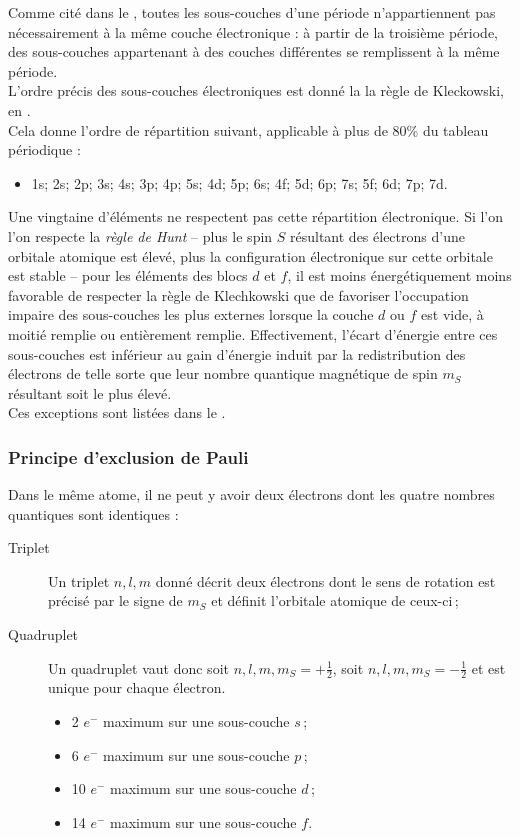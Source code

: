 Comme cité dans le , toutes les sous-couches d'une période n'appartiennent pas nécessairement à la même couche électronique : à partir de la troisième période, des sous-couches appartenant à des couches différentes se remplissent à la même période.\\L'ordre précis des sous-couches électroniques est donné la la règle de Kleckowski, en .\\
Cela donne l'ordre de répartition suivant, applicable à plus de 80\% du tableau périodique : 
\begin{itemize}
	\item 1s; 2s; 2p; 3s; 4s; 3p; 4p; 5s; 4d; 5p; 6s; 4f; 5d; 6p; 7s; 5f; 6d; 7p; 7d.
\end{itemize}



Une vingtaine d'éléments ne respectent pas cette répartition électronique. Si l'on l'on respecte la \emph{règle de Hunt} -- plus le spin $S$ résultant des électrons d'une orbitale atomique est élevé, plus la configuration électronique sur cette orbitale est stable -- pour les éléments des blocs $d$ et $f$, il est moins énergétiquement moins favorable de respecter la règle de Klechkowski que de favoriser l'occupation impaire des sous-couches les plus externes lorsque la couche $d$ ou $f$ est vide, à moitié remplie ou entièrement remplie. Effectivement, l'écart d'énergie entre ces sous-couches est inférieur au gain d'énergie induit par la redistribution des électrons de telle sorte que leur nombre quantique magnétique de spin $m_S$ résultant soit le plus élevé.\\
Ces \og exceptions \fg{} sont listées dans le .

\subsubsection{Principe d'exclusion de Pauli}

 Dans le même atome, il ne peut y avoir deux électrons dont les quatre nombres quantiques sont identiques : \begin{description}
	\item[Triplet] Un triplet $n, l, m$ donné décrit deux électrons dont le sens de rotation est précisé par le signe de $m_S$ et définit l'orbitale atomique de ceux-ci\,;
	\item[Quadruplet]  Un quadruplet vaut donc soit $n, l, m, m_S=+\frac{1}{2}$, soit $n, l, m, m_S=-\frac{1}{2}$ et est unique pour chaque électron.
	\begin{itemize}
		\item 2 $e^-$ maximum sur une sous-couche $s$\,;
		\item 6 $e^-$ maximum sur une sous-couche $p$\,;
		\item 10 $e^-$ maximum sur une sous-couche $d$\,;
		\item 14 $e^-$ maximum sur une sous-couche $f$.
	\end{itemize}
\end{description}
 

